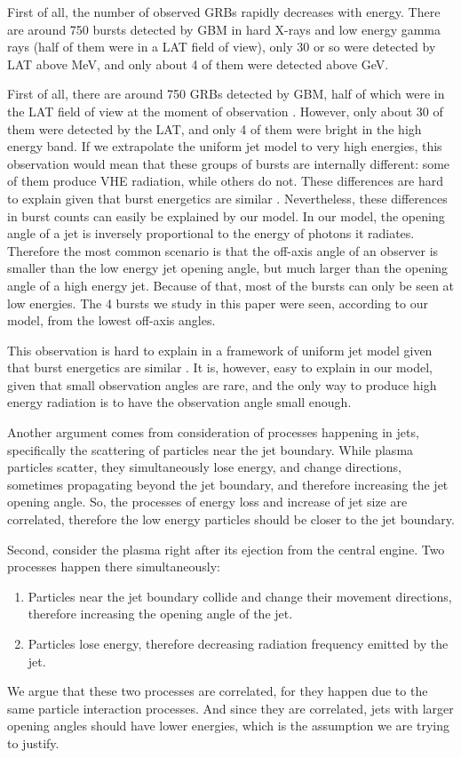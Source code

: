 \documentclass{article}
\begin{document}
First of all, the number of observed GRBs rapidly decreases with energy.
There are around 750 bursts detected by GBM in hard X-rays and low
energy gamma rays \cite{Vianello:2013ela} (half of them were in a LAT
field of view), only 30 or so were detected by LAT above
\unit[100]{MeV}, and only about 4 of them were detected above GeV.


First of all, there are around 750 GRBs detected by GBM, half of which
were in the LAT field of view at the moment of observation
\cite{Vianello:2013ela}.  However, only about 30 of them were detected
by the LAT, and only 4 of them were bright in the high energy band.
If we extrapolate the uniform jet model to very high energies, this
observation would mean that these groups of bursts are internally
different: some of them produce VHE radiation, while others do not.
These differences are hard to explain given that burst energetics are
similar \cite{Bloom:2003wy}.  Nevertheless, these differences in burst
counts can easily be explained by our model.  In our model, the
opening angle of a jet is inversely proportional to the energy of
photons it radiates.  Therefore the most common scenario is that the
off-axis angle of an observer is smaller than the low energy jet
opening angle, but much larger than the opening angle of a high energy
jet.  Because of that, most of the bursts can only be seen at low
energies.  The 4 bursts we study in this paper were seen, according to
our model, from the lowest off-axis angles.


This observation is hard to explain in a framework of uniform jet model given that burst energetics are similar \cite{Bloom:2003wy}.
It is, however, easy to explain in our model, given that small observation angles are rare, and the only way to produce high energy radiation is to have the observation angle small enough.

Another argument comes from consideration of processes happening in
jets, specifically the scattering of particles near the jet boundary.
While plasma particles scatter, they simultaneously lose energy, and
change directions, sometimes propagating beyond the jet boundary, and
therefore increasing the jet opening angle.  So, the processes of
energy loss and increase of jet size are correlated, therefore the low
energy particles should be closer to the jet boundary.

Second, consider the plasma right after its ejection from the central
engine.  Two processes happen there simultaneously:
\begin{enumerate}
	\item{Particles near the jet boundary collide and change their
          movement directions, therefore increasing the opening angle
          of the jet.}
	\item{Particles lose energy, therefore decreasing radiation
          frequency emitted by the jet.}
\end{enumerate}
We argue that these two processes are correlated, for they happen due
to the same particle interaction processes.  And since they are
correlated, jets with larger opening angles should have lower
energies, which is the assumption we are trying to justify.
\end{document}
